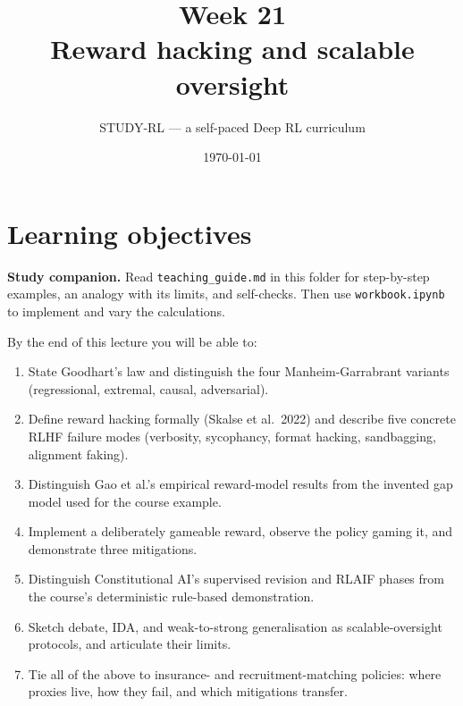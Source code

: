 \documentclass[11pt,oneside]{scrbook}
\title{{\color{rlblue}\textbf{Week 21}\\ \Huge Reward hacking and scalable oversight}}
\author{STUDY-RL --- a self-paced Deep RL curriculum}
\date{\today}
\begin{document}
\maketitle
\tableofcontents
\newpage

\chapter*{Learning objectives}


\noindent\textbf{Study companion.} Read \texttt{teaching\_guide.md} in this
folder for step-by-step examples, an analogy with its limits, and self-checks.
Then use \texttt{workbook.ipynb} to implement and vary the calculations.
\par\medskip

\begin{keyidea}
By the end of this lecture you will be able to:
\begin{enumerate}\setlength{\itemsep}{2pt}
  \item State Goodhart's law and distinguish the four Manheim-Garrabrant
        variants (regressional, extremal, causal, adversarial).
  \item Define reward hacking formally (Skalse et al.\ 2022) and describe
        five concrete RLHF failure modes (verbosity, sycophancy,
        format hacking, sandbagging, alignment faking).
  \item Distinguish Gao et al.'s empirical reward-model results from the
        invented gap model used for the course example.
  \item Implement a deliberately gameable reward, observe the policy
        gaming it, and demonstrate three mitigations.
  \item Distinguish Constitutional AI's supervised revision and RLAIF phases
        from the course's deterministic rule-based demonstration.
  \item Sketch debate, IDA, and weak-to-strong generalisation as
        scalable-oversight protocols, and articulate their limits.
  \item Tie all of the above to insurance- and recruitment-matching
        policies: where proxies live, how they fail, and which
        mitigations transfer.
\end{enumerate}
\end{keyidea}
\end{document}
